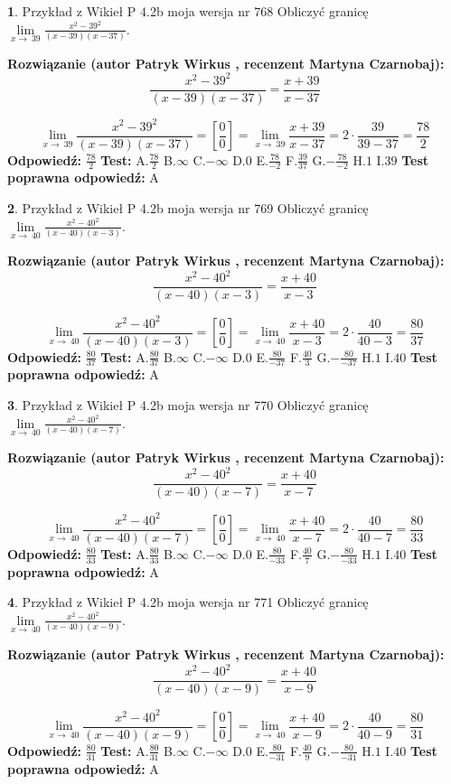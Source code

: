 \documentclass[12pt, a4paper]{article}
\theoremstyle{definition} %
\newtheorem{zad}{}
\newcommand{\zadStart}[1]{\begin{zad}#1\newline}
\newcommand{\zadStop}{\end{zad}}
\newcommand{\rozwStart}[2]{\noindent \textbf{Rozwiązanie (autor #1 , recenzent #2): }\newline}
\newcommand{\rozwStop}{\newline}
\newcommand{\odpStart}{\noindent \textbf{Odpowiedź:}\newline}
\newcommand{\odpStop}{\newline}
\newcommand{\testStart}{\noindent \textbf{Test:}\newline}
\newcommand{\testStop}{\newline}
\newcommand{\kluczStart}{\noindent \textbf{Test poprawna odpowiedź:}\newline}
\newcommand{\kluczStop}{\newline}
\begin{document}
\zadStart{Przykład z Wikieł P 4.2b moja wersja nr 768}
Obliczyć granicę $\lim\limits_{x\to\ 39}\frac{x^{2}-39^{2}}{(x-39)(x-37)}$.
\zadStop
\rozwStart{Patryk Wirkus}{Martyna Czarnobaj}
$$\frac{x^{2}-39^{2}}{(x-39)(x-37)}=\frac{x+39}{x-37}$$

$$\lim\limits_{x\to\ 39}\frac{x^{2}-39^{2}}{(x-39)(x-37)}=[\frac{0}{0}]=\lim\limits_{x\to\ 39}\frac{x+39}{x-37}=2 \cdot \frac{39}{39-37} = \frac{78}{2}$$
\rozwStop
\odpStart
$\frac{78}{2}$
\odpStop
\testStart
A.$\frac{78}{2}$
B.$\infty$
C.$-\infty$
D.$0$
E.$\frac{78}{-2}$
F.$\frac{39}{37}$
G.$-\frac{78}{-2}$
H.$1$
I.$39$
\testStop
\kluczStart
A
\kluczStop



\zadStart{Przykład z Wikieł P 4.2b moja wersja nr 769}
Obliczyć granicę $\lim\limits_{x\to\ 40}\frac{x^{2}-40^{2}}{(x-40)(x-3)}$.
\zadStop
\rozwStart{Patryk Wirkus}{Martyna Czarnobaj}
$$\frac{x^{2}-40^{2}}{(x-40)(x-3)}=\frac{x+40}{x-3}$$

$$\lim\limits_{x\to\ 40}\frac{x^{2}-40^{2}}{(x-40)(x-3)}=[\frac{0}{0}]=\lim\limits_{x\to\ 40}\frac{x+40}{x-3}=2 \cdot \frac{40}{40-3} = \frac{80}{37}$$
\rozwStop
\odpStart
$\frac{80}{37}$
\odpStop
\testStart
A.$\frac{80}{37}$
B.$\infty$
C.$-\infty$
D.$0$
E.$\frac{80}{-37}$
F.$\frac{40}{3}$
G.$-\frac{80}{-37}$
H.$1$
I.$40$
\testStop
\kluczStart
A
\kluczStop



\zadStart{Przykład z Wikieł P 4.2b moja wersja nr 770}
Obliczyć granicę $\lim\limits_{x\to\ 40}\frac{x^{2}-40^{2}}{(x-40)(x-7)}$.
\zadStop
\rozwStart{Patryk Wirkus}{Martyna Czarnobaj}
$$\frac{x^{2}-40^{2}}{(x-40)(x-7)}=\frac{x+40}{x-7}$$

$$\lim\limits_{x\to\ 40}\frac{x^{2}-40^{2}}{(x-40)(x-7)}=[\frac{0}{0}]=\lim\limits_{x\to\ 40}\frac{x+40}{x-7}=2 \cdot \frac{40}{40-7} = \frac{80}{33}$$
\rozwStop
\odpStart
$\frac{80}{33}$
\odpStop
\testStart
A.$\frac{80}{33}$
B.$\infty$
C.$-\infty$
D.$0$
E.$\frac{80}{-33}$
F.$\frac{40}{7}$
G.$-\frac{80}{-33}$
H.$1$
I.$40$
\testStop
\kluczStart
A
\kluczStop



\zadStart{Przykład z Wikieł P 4.2b moja wersja nr 771}
Obliczyć granicę $\lim\limits_{x\to\ 40}\frac{x^{2}-40^{2}}{(x-40)(x-9)}$.
\zadStop
\rozwStart{Patryk Wirkus}{Martyna Czarnobaj}
$$\frac{x^{2}-40^{2}}{(x-40)(x-9)}=\frac{x+40}{x-9}$$

$$\lim\limits_{x\to\ 40}\frac{x^{2}-40^{2}}{(x-40)(x-9)}=[\frac{0}{0}]=\lim\limits_{x\to\ 40}\frac{x+40}{x-9}=2 \cdot \frac{40}{40-9} = \frac{80}{31}$$
\rozwStop
\odpStart
$\frac{80}{31}$
\odpStop
\testStart
A.$\frac{80}{31}$
B.$\infty$
C.$-\infty$
D.$0$
E.$\frac{80}{-31}$
F.$\frac{40}{9}$
G.$-\frac{80}{-31}$
H.$1$
I.$40$
\testStop
\kluczStart
A
\kluczStop
\end{document}
